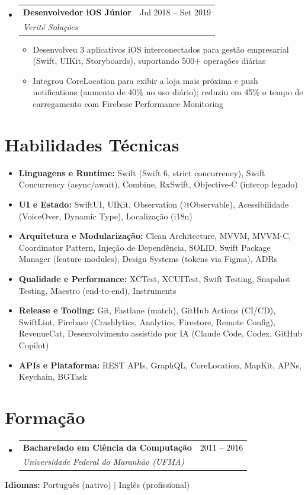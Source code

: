 \documentclass[11pt,letterpaper]{article}
\makeatletter
\newcommand{\resumeSubheading}[4]{
  \item
    \begin{tabular*}{\linewidth}{l@{\extracolsep{\fill}}r}
      \textbf{#1} & #2 \\
      \textit{#3} & \textit{#4} \\
    \end{tabular*}
}
\newcommand{\resumeItem}[1]{
  \item{#1}
}
\makeatother
\begin{document}
\begin{itemize}[leftmargin=0.15in, label={}]
    \resumeSubheading
        {Desenvolvedor iOS Júnior}{Jul 2018 -- Set 2019}
        {Verité Soluções}{}
        \begin{itemize}
            \resumeItem{Desenvolveu 3 aplicativos iOS interconectados para gestão empresarial (Swift, UIKit, Storyboards), suportando 500+ operações diárias}
            \resumeItem{Integrou CoreLocation para exibir a loja mais próxima e push notifications (aumento de 40\% no uso diário); reduziu em 45\% o tempo de carregamento com Firebase Performance Monitoring}
        \end{itemize}
\end{itemize}

\section*{Habilidades Técnicas}

\begin{itemize}[leftmargin=0.15in, label={}]
    \item \textbf{Linguagens e Runtime:} Swift (Swift 6, strict concurrency), Swift Concurrency (async/await), Combine, RxSwift, Objective-C (interop legado)
    \item \textbf{UI e Estado:} SwiftUI, UIKit, Observation (\mbox{@Observable}), Acessibilidade (VoiceOver, Dynamic Type), Localização (i18n)
    \item \textbf{Arquitetura e Modularização:} Clean Architecture, MVVM, MVVM-C, Coordinator Pattern, Injeção de Dependência, SOLID, Swift Package Manager (feature modules), Design Systems (tokens via Figma), ADRs
    \item \textbf{Qualidade e Performance:} XCTest, XCUITest, Swift Testing, Snapshot Testing, Maestro (end-to-end), Instruments
    \item \textbf{Release e Tooling:} Git, Fastlane (match), GitHub Actions (CI/CD), SwiftLint, Firebase (Crashlytics, Analytics, Firestore, Remote Config), RevenueCat, Desenvolvimento assistido por IA (Claude Code, Codex, GitHub Copilot)
    \item \textbf{APIs e Plataforma:} REST APIs, GraphQL, CoreLocation, MapKit, APNs, Keychain, BGTask
\end{itemize}

\section*{Formação}

\begin{itemize}[leftmargin=0.15in, label={}]
    \resumeSubheading
        {Bacharelado em Ciência da Computação}{2011 -- 2016}
        {Universidade Federal do Maranhão (UFMA)}{}

\end{itemize}

\vspace{0.3em}
\noindent\textbf{Idiomas:} Português (nativo) $|$ Inglês (profissional)
\end{document}
